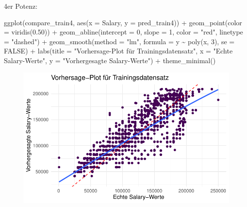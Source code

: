\documentclass[
  letterpaper,
  DIV=11,
  numbers=noendperiod]{scrartcl}
\newenvironment{Shaded}{\begin{snugshade}}{\end{snugshade}}
\newcommand{\AttributeTok}[1]{\textcolor[rgb]{0.40,0.45,0.13}{#1}}
\newcommand{\ConstantTok}[1]{\textcolor[rgb]{0.56,0.35,0.01}{#1}}
\newcommand{\DecValTok}[1]{\textcolor[rgb]{0.68,0.00,0.00}{#1}}
\newcommand{\FloatTok}[1]{\textcolor[rgb]{0.68,0.00,0.00}{#1}}
\newcommand{\FunctionTok}[1]{\textcolor[rgb]{0.28,0.35,0.67}{#1}}
\newcommand{\NormalTok}[1]{\textcolor[rgb]{0.00,0.23,0.31}{#1}}
\newcommand{\SpecialCharTok}[1]{\textcolor[rgb]{0.37,0.37,0.37}{#1}}
\newcommand{\StringTok}[1]{\textcolor[rgb]{0.13,0.47,0.30}{#1}}
\begin{document}
4er Potenz:

\begin{Shaded}
\begin{Highlighting}[]
\FunctionTok{ggplot}\NormalTok{(compare\_train4, }\FunctionTok{aes}\NormalTok{(}\AttributeTok{x =}\NormalTok{ Salary, }\AttributeTok{y =}\NormalTok{ pred\_train4)) }\SpecialCharTok{+}
  \FunctionTok{geom\_point}\NormalTok{(}\AttributeTok{color =} \FunctionTok{viridis}\NormalTok{(}\FloatTok{0.50}\NormalTok{)) }\SpecialCharTok{+}
  \FunctionTok{geom\_abline}\NormalTok{(}\AttributeTok{intercept =} \DecValTok{0}\NormalTok{, }\AttributeTok{slope =} \DecValTok{1}\NormalTok{, }\AttributeTok{color =} \StringTok{"red"}\NormalTok{, }\AttributeTok{linetype =} \StringTok{"dashed"}\NormalTok{) }\SpecialCharTok{+}
  \FunctionTok{geom\_smooth}\NormalTok{(}\AttributeTok{method =} \StringTok{"lm"}\NormalTok{, }\AttributeTok{formula =}\NormalTok{ y }\SpecialCharTok{\textasciitilde{}} \FunctionTok{poly}\NormalTok{(x, }\DecValTok{3}\NormalTok{), }\AttributeTok{se =} \ConstantTok{FALSE}\NormalTok{) }\SpecialCharTok{+}
  \FunctionTok{labs}\NormalTok{(}\AttributeTok{title =} \StringTok{"Vorhersage{-}Plot für Trainingsdatensatz"}\NormalTok{,}
       \AttributeTok{x =} \StringTok{"Echte Salary{-}Werte"}\NormalTok{,}
       \AttributeTok{y =} \StringTok{"Vorhergesagte Salary{-}Werte"}\NormalTok{) }\SpecialCharTok{+}
  \FunctionTok{theme\_minimal}\NormalTok{()}
\end{Highlighting}
\end{Shaded}

\begin{figure}[H]

{\centering \includegraphics{main_doc_files/figure-pdf/unnamed-chunk-148-1.pdf}

}

\end{figure}
\end{document}
